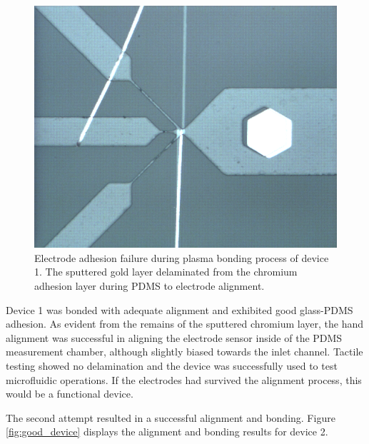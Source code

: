 \begin{figure}[h]
    \centering
    \includegraphics[width=\textwidth]{images/bad_device.png}
    \caption[Device 1 bonding failure.]{Electrode adhesion failure during plasma bonding process of device 1. The sputtered gold layer delaminated from the chromium adhesion layer during PDMS to electrode alignment.}
    \label{fig:bad_device}
\end{figure}

\FloatBarrier

\par Device 1 was bonded with adequate alignment and exhibited good glass-PDMS adhesion. As evident from the remains of the sputtered chromium layer, the hand alignment was successful in aligning the electrode sensor inside of the PDMS measurement chamber, although slightly biased towards the inlet channel. Tactile testing showed no delamination and the device was successfully used to test microfluidic operations. If the electrodes had survived the alignment process, this would be a functional device. 

\par The second attempt resulted in a successful alignment and bonding. Figure \ref{fig:good_device} displays the alignment and bonding results for device 2. 

